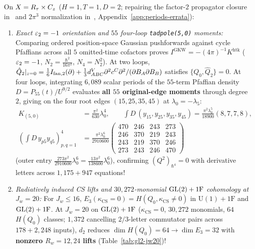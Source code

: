 \begin{theorem}[{$3\mathrm{D}$ $\mathcal{N}=2$ $\eps_2=-1$ orientation, $55$ \texttt{tadpole(5,0)} moments, $\GL(2)$ $J_w=20$, and $\mathcal{N}\ge 4$ HT twists~{\cite{CDG20,GKW,Repo9e833c8}}}]
\label{thm:3d-n2-complete}
On $X = R_\tau\times C_z$ ($H=1, T=1, D=2$; repairing the factor-$2$ propagator closure in~\cite{CDG20} and $2\pi^3$ normalization in~\cite{GKW}, Appendix~\ref{app:periods-errata}):
\begin{enumerate}[label=(\arabic*),leftmargin=*]
  \item \emph{Exact $\eps_2 = -1$ orientation and $55$ four-loop \texttt{tadpole(5,0)} moments:} Comparing ordered position-space Gaussian pushforwards against cycle Pfaffians across all $5$ omitted-time cofactors proves $I^{\mathrm{GKW}} = -(4\pi)^{-1}K^{\mathrm{htk}}$ (\textbf{$\eps_2 = -1$}, $N_2 = \frac{\hbar^2}{16\pi^2}$, $N_4 = N_2^2$). At two loops, $\hat{Q}_2|_{z=0} = \frac{1}{6}I_{\mathrm{fan},2}(\partial) + \frac{1}{3}d^V_{ABC}\partial^2c^C\partial^2/(\partial B_A\partial B_B)$ satisfies $\{Q_0,\hat{Q}_2\}=0$. At four loops, integrating $6{,}089$ scalar periods of the $55$-term Pfaffian density $D = P_{55}(t)/U^{9/2}$ evaluates \textbf{all $55$ original-edge moments} through degree $2$, giving on the four root edges $(15,25,35,45)$ at $\lambda_0 = -\lambda_5$:
  \begin{equation}
  \label{eq:tadpole50-moments}
  \begin{aligned}
  K_{(5,0)} &= \frac{\pi^2}{630}\lambda_0^4,\qquad
  \int D\,(y_{15},y_{25},y_{35},y_{45}) = \frac{\pi^2\lambda_0^5}{18900}(8,7,7,8),\\
  \left(\int D\,y_{p5}y_{q5}\right)_{p,q=1}^4 &= \frac{\pi^2\lambda_0^6}{2910600}\begin{pmatrix}470&246&243&273\\246&370&219&243\\243&219&370&246\\273&243&246&470\end{pmatrix}
  \end{aligned}
  \end{equation}
  (outer entry $\frac{273\pi^2}{2910600}\lambda_0^6 = \frac{13\pi^2}{138600}\lambda_0^6$), confirming $(Q^2)_{\hbar^4} = 0$ with derivative letters across $1{,}175 + 947$ equations!

  \item \emph{Radiatively induced CS lifts and $30{,}272$-monomial $\operatorname{GL}(2)+1\mathrm{F}$ cohomology at $J_w = 20$:} For $J_w \le 16$, $E_3(\kappa_{\mathrm{CS}}=0) = H(Q_0,\kappa_{\mathrm{CS}}\neq 0)$ in $\mathrm{U}(1)+1\mathrm{F}$ and $\operatorname{GL}(2)+1\mathrm{F}$. At \textbf{$J_w = 20$} on $\operatorname{GL}(2)+1\mathrm{F}$ ($\kappa_{\mathrm{CS}}=0$, $30{,}272$ monomials, $64$ $H(Q_0)$ classes; $1{,}372$ cancelling $2/3$-letter commutator pairs across $178 + 2{,}248$ inputs), $d_2$ reduces $\dim H(Q_0) = 64 \to \dim E_3 = 32$ with \textbf{nonzero $R_w = 12, 24$ lifts} (Table~\ref{tab:gl2-jw20})!


\end{enumerate}
\end{theorem}
